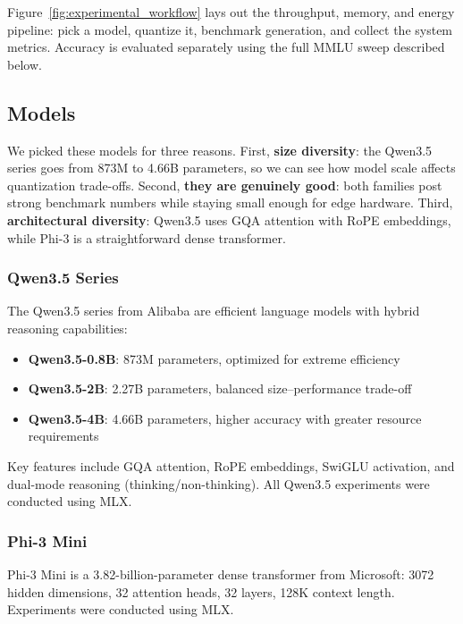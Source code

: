 \documentclass[journal]{IEEEtran}
\begin{document}
Figure~\ref{fig:experimental_workflow} lays out the throughput, memory, and energy pipeline: pick a model, quantize it, benchmark generation, and collect the system metrics. Accuracy is evaluated separately using the full MMLU sweep described below.

\subsection{Models}

We picked these models for three reasons. First, \textbf{size diversity}: the Qwen3.5 series goes from 873M to 4.66B parameters, so we can see how model scale affects quantization trade-offs. Second, \textbf{they are genuinely good}: both families post strong benchmark numbers while staying small enough for edge hardware. Third, \textbf{architectural diversity}: Qwen3.5 uses GQA attention with RoPE embeddings, while Phi-3 is a straightforward dense transformer.

\subsubsection{Qwen3.5 Series}

The Qwen3.5 series \cite{qwen2025technical} from Alibaba are efficient language models with hybrid reasoning capabilities:

\begin{itemize}[leftmargin=*,nosep]
    \item \textbf{Qwen3.5-0.8B}: 873M parameters, optimized for extreme efficiency
    \item \textbf{Qwen3.5-2B}: 2.27B parameters, balanced size--performance trade-off
    \item \textbf{Qwen3.5-4B}: 4.66B parameters, higher accuracy with greater resource requirements
\end{itemize}

Key features include GQA attention, RoPE embeddings, SwiGLU activation, and dual-mode reasoning (thinking/non-thinking). All Qwen3.5 experiments were conducted using MLX.

\subsubsection{Phi-3 Mini}

Phi-3 Mini \cite{abdin2024phi3} is a 3.82-billion-parameter dense transformer from Microsoft: 3072 hidden dimensions, 32 attention heads, 32 layers, 128K context length. Experiments were conducted using MLX.
\end{document}
